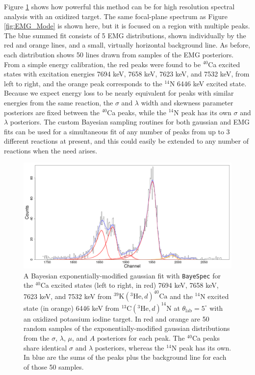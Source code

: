 Figure \ref{fig:EMG_Multiplet} shows how powerful this method can be for high resolution spectral analysis with an oxidized target. The same focal-plane spectrum as Figure \ref{fig:EMG_Mode} is shown here, but it is focused on a region with multiple peaks. The blue summed fit consists of 5 EMG distributions, shown individually by the red and orange lines, and a small, virtually horizontal background line. As before, each distribution shows 50 lines drawn from samples of the EMG posteriors. From a simple energy calibration, the red peaks were found to be $^{40}$Ca excited states with excitation energies 7694 keV, 7658 keV, 7623 keV, and 7532 keV, from left to right, and the orange peak corresponds to the $^{14}$N 6446 keV excited state. Because we expect energy loss to be nearly equivalent for peaks with similar energies from the same reaction, the $\sigma$ and $\lambda$ width and skewness parameter posteriors are fixed between the $^{40}$Ca peaks, while the $^{14}$N peak has its own $\sigma$ and $\lambda$ posteriors. The custom Bayesian sampling routines for both gaussian and EMG fits can be used for a simultaneous fit of any number of peaks from up to 3 different reactions at present, and this could easily be extended to any number of reactions when the need arises.

\begin{figure}[t]
\centering
\includegraphics[width=6.5in]{Chapter-6/figs/EMG_Multiplet.png}
\caption{\label{fig:EMG_Multiplet}A Bayesian exponentially-modified gaussian fit with \texttt{BayeSpec} for the $^{40}$Ca excited states (left to right, in red) 7694 keV, 7658 keV, 7623 keV, and 7532 keV from $^{39}\mathrm{K}(^{3}\mathrm{He},d)^{40}\mathrm{Ca}$ and the $^{14}$N excited state (in orange) 6446 keV from $^{13}\mathrm{C}(^{3}\mathrm{He},d)^{14}\mathrm{N}$ at $\theta_{\mathrm{lab}} = 5^{\circ}$ with an oxidized potassium iodine target. In red and orange are 50 random samples of the exponentially-modified gaussian distributions from the $\sigma$, $\lambda$, $\mu$, and $A$ posteriors for each peak. The $^{40}$Ca peaks share identical $\sigma$ and $\lambda$ posteriors, whereas the $^{14}$N peak has its own. In blue are the sums of the peaks plus the background line for each of those 50 samples.}
\end{figure}

